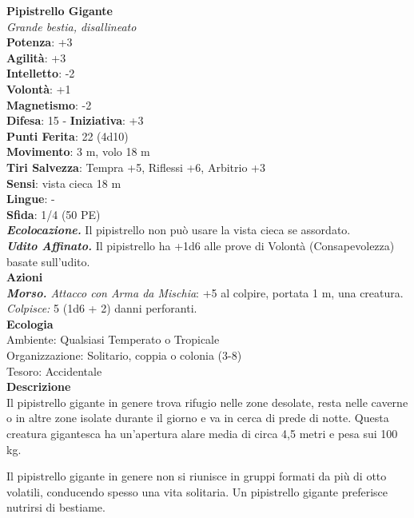 \begin{multicols}{2}
\medskip\textbf{Pipistrello Gigante}\\
\emph{Grande bestia, disallineato}\\
\textbf{Potenza}: +3\\
\textbf{Agilità}: +3\\
\textbf{Intelletto}: -2\\
\textbf{Volontà}: +1\\
\textbf{Magnetismo}: -2\\
\textbf{Difesa}: 15 - \textbf{Iniziativa}: +3\\
\textbf{Punti Ferita}: 22 (4d10)\\
\textbf{Movimento}: 3 m, volo 18 m\\
\textbf{Tiri Salvezza}: Tempra +5, Riflessi +6, Arbitrio +3 \\
\textbf{Sensi}: vista cieca 18 m\\
\textbf{Lingue}: -\\
\textbf{Sfida}: 1/4 (50 PE)\smallskip\\
\emph{\textbf{Ecolocazione.}} Il pipistrello non può usare la vista cieca se assordato.\\
\emph{\textbf{Udito Affinato.}} Il pipistrello ha +1d6 alle prove di Volontà (Consapevolezza) basate sull'udito.\\
\smallskip\textbf{Azioni}\\
\emph{\textbf{Morso.} Attacco con Arma da Mischia}: +5 al colpire, portata 1 m, una creatura.\\
\emph{Colpisce:} 5 (1d6 + 2) danni perforanti.\\
\textbf{Ecologia}\\
Ambiente: Qualsiasi Temperato o Tropicale\\
Organizzazione: Solitario, coppia o colonia (3-8)\\
Tesoro: Accidentale \\
\textbf{Descrizione}\\

Il pipistrello gigante in genere trova rifugio nelle zone desolate, resta nelle caverne o in altre zone isolate durante il giorno e va in cerca di prede di notte. Questa creatura gigantesca ha un’apertura alare media di circa 4,5 metri e pesa sui 100 kg.

Il pipistrello gigante in genere non si riunisce in gruppi formati da più di otto volatili, conducendo spesso una vita solitaria. Un pipistrello gigante preferisce nutrirsi di bestiame. 


\end{multicols}
